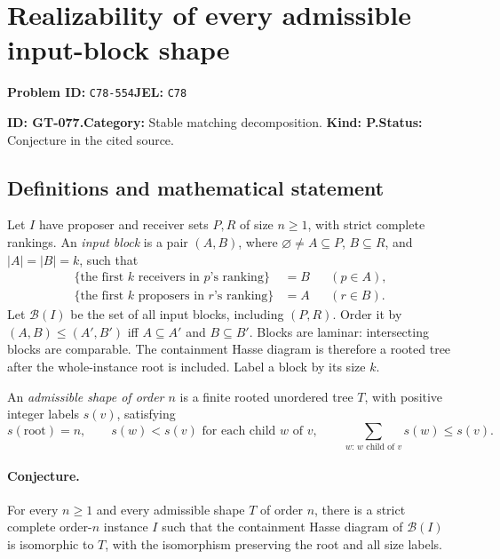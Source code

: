 \documentclass[11pt,a4paper]{article}
\begin{document}
\section*{Realizability of every admissible input-block shape}
\textbf{Problem ID:} \texttt{C78-554}\quad \textbf{JEL:} \texttt{C78}\par
\label{problem:OP-0207}
\label{game:GT-077}
{\sffamily\small\color{muted}
\noindent\textbf{ID: GT-077.}\quad\textbf{Category:} Stable matching decomposition.
\quad\textbf{Kind: P.}\quad\textbf{Status:} Conjecture in the cited source.
\par}
\subsection*{Definitions and mathematical statement}
Let \(I\) have proposer and receiver sets \(P,R\) of size \(n\geq 1\),
with strict complete rankings. An \emph{input block} is a pair
\((A,B)\), where \(\varnothing\ne A\subseteq P\),
\(B\subseteq R\), and \(|A|=|B|=k\), such that
\[
 \begin{aligned}
 \{\text{the first }k\text{ receivers in }p\text{'s ranking}\}
     &=B &&(p\in A),\\
 \{\text{the first }k\text{ proposers in }r\text{'s ranking}\}
     &=A &&(r\in B).
 \end{aligned}
\]
Let \(\mathcal B(I)\) be the set of all input blocks, including
\((P,R)\). Order it by
\((A,B)\leq(A',B')\) iff \(A\subseteq A'\) and \(B\subseteq B'\).
Blocks are laminar: intersecting blocks are comparable.
The containment Hasse diagram is therefore a rooted tree after the
whole-instance root is included. Label a block by its size \(k\).

An \emph{admissible shape of order \(n\)} is a finite rooted unordered
tree \(T\), with positive integer labels \(s(v)\), satisfying
\[
 s(\mathrm{root})=n,\qquad
 s(w)<s(v)\text{ for each child }w\text{ of }v,\qquad
 \sum_{w:\,w\text{ child of }v}s(w)\leq s(v).
\]

\paragraph{Conjecture.}
For every \(n\geq1\) and every admissible shape \(T\) of order \(n\),
there is a strict complete order-\(n\) instance \(I\) such that the
containment Hasse diagram of \(\mathcal B(I)\) is isomorphic to \(T\),
with the isomorphism preserving the root and all size labels.
\end{document}
